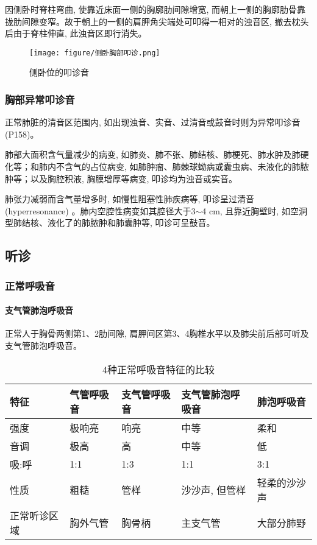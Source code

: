 \documentclass[UTF8]{ctexbook}
\begin{document}
因侧卧时脊柱弯曲, 使靠近床面一侧的胸廓肋间隙增宽, 而朝上一侧的胸廓肋骨靠拢肋间隙变窄。故于朝上的一侧的肩胛角尖端处可叩得一相对的浊音区, 撤去枕头后由于脊柱伸直, 此浊音区即行消失。

\begin{figure}[htbp]
    \centering
    \texttt{[image: figure/侧卧胸部叩诊.png]}
    \caption{侧卧位的叩诊音}
\end{figure}

\subsubsection{胸部异常叩诊音}
正常肺脏的清音区范围内, 如出现浊音、实音、过清音或鼓音时则为异常叩诊音(P158)。

肺部大面积含气量减少的病变, 如肺炎、肺不张、肺结核、肺梗死、肺水肿及肺硬化等；和肺内不含气的占位病变, 如肺肿瘤、肺棘球蚴病或囊虫病、未液化的肺脓肿等；以及胸腔积液, 胸膜增厚等病变, 叩诊均为浊音或实音。

肺张力减弱而含气量增多时, 如慢性阻塞性肺疾病等, 叩诊呈过清音(hyperresonance) 。肺内空腔性病变如其腔径大于3$\sim$4 cm, 且靠近胸壁时, 如空洞型肺结核、液化了的肺脓肿和肺囊肿等, 叩诊可呈鼓音。
\subsection{听诊}

\subsubsection{正常呼吸音}
\paragraph{支气管肺泡呼吸音}正常人于胸骨两侧第1、2肋间隙, 肩胛间区第3、4胸椎水平以及肺尖前后部可听及支气管肺泡呼吸音。
\begin{table}[htbp]
    \centering
    \caption{4种正常呼吸音特征的比较}
    \begin{tabular}{l*{4}{L{0.18\textwidth}}}
        \hline
        特征         & 气管呼吸音 & 支气管呼吸音 & 支气管肺泡呼吸音 & 肺泡呼吸音   \\
        \hline
        强度         & 极响亮     & 响亮         & 中等             & 柔和         \\
        音调         & 极高       & 高           & 中等             & 低           \\
        吸:呼        & 1:1        & 1:3          & 1:1              & 3:1          \\
        性质         & 粗糙       & 管样         & 沙沙声, 但管样   & 轻柔的沙沙声 \\
        正常听诊区域 & 胸外气管   & 胸骨柄       & 主支气管         & 大部分肺野   \\
        \hline
    \end{tabular}%
    \label{tab:addlabel}%
\end{table}%
\end{document}
